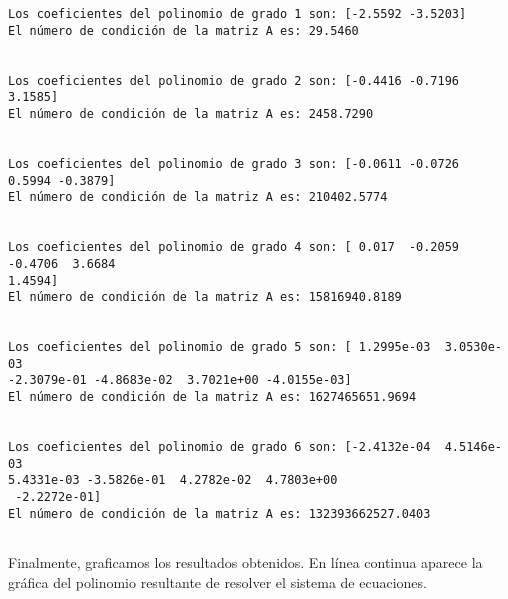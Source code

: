 \documentclass[11pt]{article}
\begin{document}
    \begin{Verbatim}[commandchars=\\\{\}]
Los coeficientes del polinomio de grado 1 son: [-2.5592 -3.5203]
El número de condición de la matriz A es: 29.5460


Los coeficientes del polinomio de grado 2 son: [-0.4416 -0.7196  3.1585]
El número de condición de la matriz A es: 2458.7290


Los coeficientes del polinomio de grado 3 son: [-0.0611 -0.0726  0.5994 -0.3879]
El número de condición de la matriz A es: 210402.5774


Los coeficientes del polinomio de grado 4 son: [ 0.017  -0.2059 -0.4706  3.6684
1.4594]
El número de condición de la matriz A es: 15816940.8189


Los coeficientes del polinomio de grado 5 son: [ 1.2995e-03  3.0530e-03
-2.3079e-01 -4.8683e-02  3.7021e+00 -4.0155e-03]
El número de condición de la matriz A es: 1627465651.9694


Los coeficientes del polinomio de grado 6 son: [-2.4132e-04  4.5146e-03
5.4331e-03 -3.5826e-01  4.2782e-02  4.7803e+00
 -2.2272e-01]
El número de condición de la matriz A es: 132393662527.0403


    \end{Verbatim}

    Finalmente, graficamos los resultados obtenidos. En línea continua
aparece la gráfica del polinomio resultante de resolver el sistema de
ecuaciones.
\end{document}
